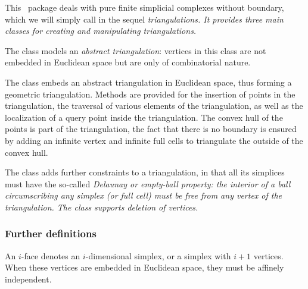 This \cgal\ package deals with pure finite simplicial complexes
without boundary, which
we will simply call in the sequel \em{triangulations}. It provides three main classes
for creating and manipulating triangulations.

The class  models an {\em abstract triangulation}: vertices in this
class are not embedded in Euclidean space but are only of combinatorial
nature.

The class  embeds an abstract
triangulation in Euclidean space, thus forming a geometric
triangulation. Methods are
provided for the insertion %
of points in the triangulation, the
traversal of various elements of the triangulation, as well as the localization of a
query point inside the triangulation.
The convex hull of the points is part of the triangulation, the fact
that there is no boundary is ensured by adding an infinite vertex and
infinite full cells to triangulate the outside of the convex hull.

The class  adds further
constraints to a triangulation, in that all its simplices must have the
so-called \em{Delaunay} or \em{empty-ball} property: the interior of
a ball circumscribing any simplex (or full cell) must be free from any
vertex of the triangulation. The  class
supports deletion of vertices.




\subsubsection{Further definitions}

An $i$-face denotes an $i$-dimensional simplex, or a simplex with $i+1$
vertices. When these vertices are embedded in Euclidean space, they must be
affinely independent.

